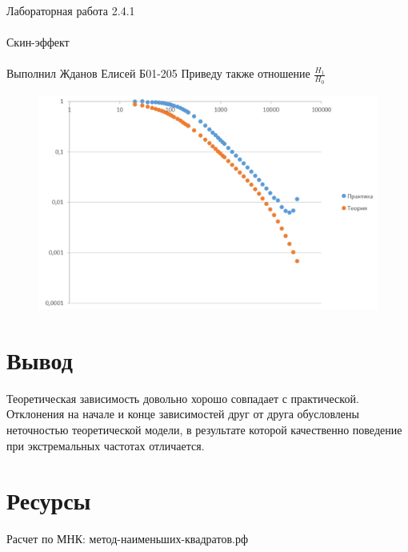 \documentclass{astroedu-lab}
\begin{document}
\begin{problem}{\huge Лабораторная работа 2.4.1\\\\Скин-эффект\\\\Выполнил Жданов Елисей Б01-205}
Приведу также отношение $\frac{H_1}{H_0}$

\begin{figure}[!h]
	\centering
	\includegraphics[width=1\textwidth]{гр7.png}
	\label{fig:boiler}
\end{figure}

\section{Вывод}

Теоретическая зависимость довольно хорошо совпадает с практической. Отклонения на начале и конце зависимостей друг от друга обусловлены неточностью теоретической модели, в результате которой качественно поведение при экстремальных частотах отличается.

\section{Ресурсы}

Расчет по МНК: метод-наименьших-квадратов.рф


\end{problem}
\end{document}
